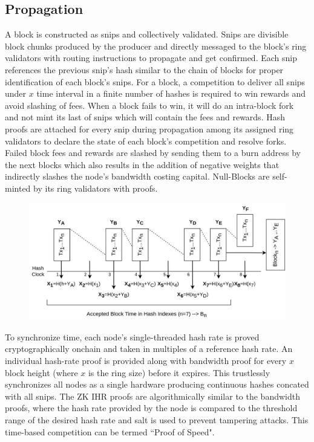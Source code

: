 \documentclass[a4paper, 10pt]{extarticle}
\begin{document}
\subsection{Propagation}
A block is constructed as snips and collectively validated. Snips are divisible block chunks produced by the producer and directly messaged to the block's ring validators with routing instructions to propagate and get confirmed. Each snip references the previous snip's hash similar to the chain of blocks for proper identification of each block's snips. For a block, a competition to deliver all snips under $x$ time interval in a finite number of hashes is required to win rewards and avoid slashing of fees. When a block fails to win, it will do an intra-block fork and not mint its last of snips which will contain the fees and rewards. Hash proofs are attached for every snip during propagation among its assigned ring validators to declare the state of each block's competition and resolve forks. Failed block fees and rewards are slashed by sending them to a burn address by the next blocks which also results in the addition of negative weights that indirectly slashes the node's bandwidth costing capital. Null-Blocks are self-minted by its ring validators with proofs.\\
\begin{figure}[H]
\begin{center}
\includegraphics[width=12cm]{Snips}
\end{center}
\end{figure}
To synchronize time, each node's single-threaded hash rate is proved cryptographically onchain and taken in multiples of a reference hash rate. An individual hash-rate proof is provided along with bandwidth proof for every $x$ block height (where $x$ is the ring size) before it expires. This trustlessly synchronizes all nodes as a single hardware producing continuous hashes concated with all snips. The ZK IHR proofs are algorithmically similar to the bandwidth proofs, where the hash rate provided by the node is compared to the threshold range of the desired hash rate and salt is used to prevent tampering attacks. This time-based competition can be termed ``Proof of Speed".
\end{document}
